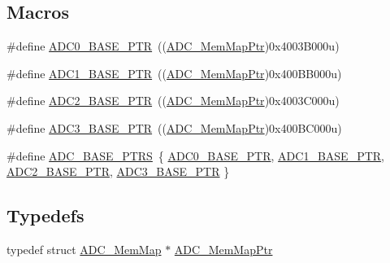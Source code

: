 \subsection*{Macros}
\begin{DoxyCompactItemize}
\item 
\#define \hyperlink{group___a_d_c___peripheral_ga6cec2f227a3a37a9fccaa830740f1f5e}{A\+D\+C0\+\_\+\+B\+A\+S\+E\+\_\+\+P\+T\+R}~((\hyperlink{group___a_d_c___peripheral_ga1673c677bf7c0ca339c8563e06de75fa}{A\+D\+C\+\_\+\+Mem\+Map\+Ptr})0x4003\+B000u)
\item 
\#define \hyperlink{group___a_d_c___peripheral_ga7fb56938ede79eea2065c4294db3b2d3}{A\+D\+C1\+\_\+\+B\+A\+S\+E\+\_\+\+P\+T\+R}~((\hyperlink{group___a_d_c___peripheral_ga1673c677bf7c0ca339c8563e06de75fa}{A\+D\+C\+\_\+\+Mem\+Map\+Ptr})0x400\+B\+B000u)
\item 
\#define \hyperlink{group___a_d_c___peripheral_ga13df5f5718b7af0f640ee605db14799e}{A\+D\+C2\+\_\+\+B\+A\+S\+E\+\_\+\+P\+T\+R}~((\hyperlink{group___a_d_c___peripheral_ga1673c677bf7c0ca339c8563e06de75fa}{A\+D\+C\+\_\+\+Mem\+Map\+Ptr})0x4003\+C000u)
\item 
\#define \hyperlink{group___a_d_c___peripheral_gadbd63bcf12f71b0dd3ac6553315dfb0e}{A\+D\+C3\+\_\+\+B\+A\+S\+E\+\_\+\+P\+T\+R}~((\hyperlink{group___a_d_c___peripheral_ga1673c677bf7c0ca339c8563e06de75fa}{A\+D\+C\+\_\+\+Mem\+Map\+Ptr})0x400\+B\+C000u)
\item 
\#define \hyperlink{group___a_d_c___peripheral_gaaa8175a3a2f4efaceeed5bd26c0b2d3f}{A\+D\+C\+\_\+\+B\+A\+S\+E\+\_\+\+P\+T\+R\+S}~\{ \hyperlink{group___a_d_c___peripheral_ga6cec2f227a3a37a9fccaa830740f1f5e}{A\+D\+C0\+\_\+\+B\+A\+S\+E\+\_\+\+P\+T\+R}, \hyperlink{group___a_d_c___peripheral_ga7fb56938ede79eea2065c4294db3b2d3}{A\+D\+C1\+\_\+\+B\+A\+S\+E\+\_\+\+P\+T\+R}, \hyperlink{group___a_d_c___peripheral_ga13df5f5718b7af0f640ee605db14799e}{A\+D\+C2\+\_\+\+B\+A\+S\+E\+\_\+\+P\+T\+R}, \hyperlink{group___a_d_c___peripheral_gadbd63bcf12f71b0dd3ac6553315dfb0e}{A\+D\+C3\+\_\+\+B\+A\+S\+E\+\_\+\+P\+T\+R} \}
\end{DoxyCompactItemize}
\subsection*{Typedefs}
\begin{DoxyCompactItemize}
\item 
typedef struct \hyperlink{struct_a_d_c___mem_map}{A\+D\+C\+\_\+\+Mem\+Map} $\ast$ \hyperlink{group___a_d_c___peripheral_ga1673c677bf7c0ca339c8563e06de75fa}{A\+D\+C\+\_\+\+Mem\+Map\+Ptr}
\end{DoxyCompactItemize}


